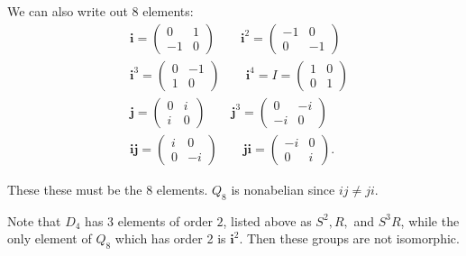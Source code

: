 \documentclass[11pt, reqno]{article}
\begin{document}
\begin{enumerate}
    We can also write out $8$ elements:
    \begin{align*}
        & \textbf{i} = \begin{pmatrix}
        0 & 1 \\ -1 & 0
        \end{pmatrix} \qquad
        \textbf{i}^2 = \begin{pmatrix}
            -1 & 0 \\ 0 & -1
        \end{pmatrix}\\
        & \textbf{i}^3 = \begin{pmatrix}
            0 & -1 \\ 1 & 0
        \end{pmatrix}\qquad 
        \textbf{i}^4 = I = \begin{pmatrix}
            1 & 0 \\ 0 & 1
        \end{pmatrix}\\
        & \textbf{j} = \begin{pmatrix}
            0 & i \\ i & 0
        \end{pmatrix} \qquad
        \textbf{j}^3 = \begin{pmatrix}
            0 & -i \\ -i & 0
        \end{pmatrix}\\
        & \textbf{ij} = \begin{pmatrix}
            i & 0 \\ 0 & -i
        \end{pmatrix}\qquad
        \textbf{ji} = \begin{pmatrix}
            -i & 0 \\ 0 & i
        \end{pmatrix}.
    \end{align*}

    These these must be the 8 elements. $Q_8$ is nonabelian since $ij \neq ji$.

    Note that $D_4$ has $3$ elements of order $2$, listed above as $S^2, R,$ and $S^3R$, while the only 
    element of $Q_8$ which has order 2 is $\textbf{i}^2$. Then these groups are not isomorphic. 

\end{enumerate}
\end{document}
